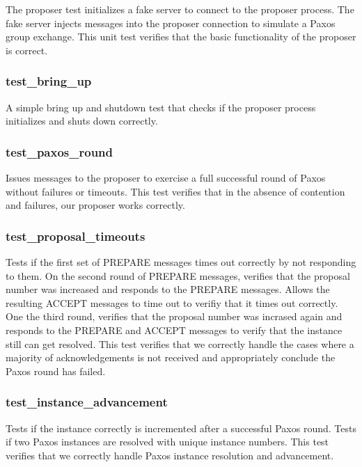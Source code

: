 \documentclass{article}
\begin{document}
The proposer test initializes a fake server to connect to the proposer process.
The fake server injects messages into the proposer connection to simulate a Paxos group exchange.
This unit test verifies that the basic functionality of the proposer is correct.

\subsubsection{test\_bring\_up}

A simple bring up and shutdown test that checks if the proposer process initializes and shuts down correctly.

\subsubsection{test\_paxos\_round}

Issues messages to the proposer to exercise a full successful round of Paxos without failures or timeouts.
This test verifies that in the absence of contention and failures, our proposer works correctly.

\subsubsection{test\_proposal\_timeouts}

Tests if the first set of PREPARE messages times out correctly by not responding to them.
On the second round of PREPARE messages, verifies that the proposal number was increased and responds to the PREPARE messages.
Allows the resulting ACCEPT messages to time out to verifiy that it times out correctly.
One the third round, verifies that the proposal number was incrased again and responds to the PREPARE and ACCEPT messages to verify that the instance still can get resolved.
This test verifies that we correctly handle the cases where a majority of acknowledgements is not received and appropriately conclude the Paxos round has failed.

\subsubsection{test\_instance\_advancement}

Tests if the instance correctly is incremented after a successful Paxos round.
Tests if two Paxos instances are resolved with unique instance numbers.
This test verifies that we correctly handle Paxos instance resolution and advancement.
\end{document}
